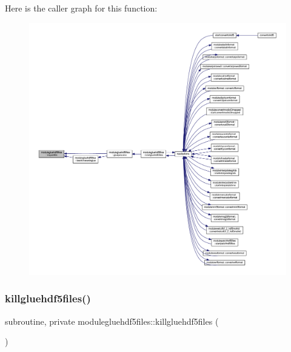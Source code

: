 Here is the caller graph for this function\+:\nopagebreak
\begin{figure}[H]
\begin{center}
\leavevmode
\includegraphics[width=350pt]{namespacemodulegluehdf5files_a94366c8fe9f21f17f5e9be7a2738a5c1_icgraph}
\end{center}
\end{figure}
\mbox{\label{namespacemodulegluehdf5files_a07002430e2da49aa4ce7da8244ca8dbd}} 
\subsubsection{\texorpdfstring{killgluehdf5files()}{killgluehdf5files()}}
{\footnotesize\ttfamily subroutine, private modulegluehdf5files\+::killgluehdf5files (\begin{DoxyParamCaption}{ }\end{DoxyParamCaption})\hspace{0.3cm}{\ttfamily [private]}}


